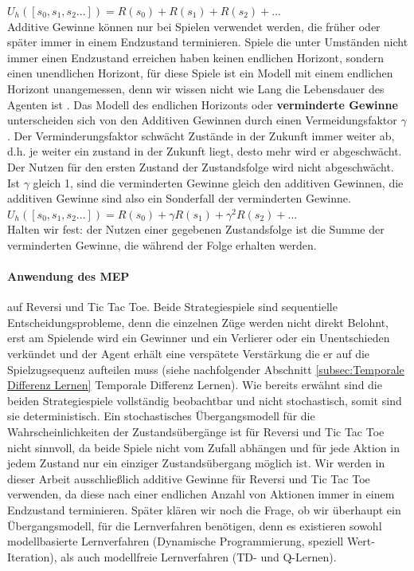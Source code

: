 $U_h([s_0, s_1, s_2 ...]) = R(s_0) + R(s_1) + R(s_2) + ...$ \\

Additive Gewinne können nur bei Spielen verwendet werden, die früher oder später immer in einem Endzustand terminieren. Spiele die unter Umständen nicht immer einen Endzustand erreichen haben keinen endlichen Horizont, sondern einen unendlichen Horizont, für diese Spiele ist ein Modell mit einem endlichen Horizont unangemessen, denn wir wissen nicht wie Lang die Lebensdauer des Agenten ist \cite[250]{KLM96}. Das Modell des endlichen Horizonts oder \textbf{verminderte Gewinne} unterscheiden sich von den Additiven Gewinnen durch einen Vermeidungsfaktor $\gamma$. Der Verminderungsfaktor schwächt Zustände in der Zukunft immer weiter ab, d.h. je weiter ein zustand in der Zukunft liegt, desto mehr wird er abgeschwächt. Der Nutzen für den ersten Zustand der Zustandsfolge wird nicht abgeschwächt. Ist $\gamma$ gleich 1, sind die verminderten Gewinne gleich den additiven Gewinnen, die additiven Gewinne sind also ein Sonderfall der verminderten Gewinne.\\

$U_h([s_0, s_1, s_2 ...]) = R(s_0) + \gamma R(s_1) + \gamma^2 R(s_2) + ...$ \\

Halten wir fest: der Nutzen einer gegebenen Zustandsfolge ist die Summe der verminderten Gewinne, die während der Folge erhalten werden.

\paragraph{Anwendung des MEP} auf Reversi und Tic Tac Toe. Beide Strategiespiele sind sequentielle Entscheidungsprobleme, denn die einzelnen Züge werden nicht direkt Belohnt, erst am Spielende wird ein Gewinner und ein Verlierer oder ein Unentschieden verkündet und der Agent erhält eine verspätete Verstärkung die er auf die Spielzugsequenz aufteilen muss (siehe nachfolgender Abschnitt \ref{subsec:Temporale Differenz Lernen} Temporale Differenz Lernen). Wie bereits erwähnt sind die beiden Strategiespiele vollständig beobachtbar und nicht stochastisch, somit sind sie deterministisch. Ein stochastisches Übergangsmodell für die Wahrscheinlichkeiten der Zustandsübergänge ist für Reversi und Tic Tac Toe nicht sinnvoll, da beide Spiele nicht vom Zufall abhängen und für jede Aktion in jedem Zustand nur ein einziger Zustandsübergang möglich ist. Wir werden in dieser Arbeit ausschließlich additive Gewinne für Reversi und Tic Tac Toe verwenden, da diese nach einer endlichen Anzahl von Aktionen immer in einem Endzustand terminieren. Später klären wir noch die Frage, ob wir überhaupt ein Übergangsmodell, für die Lernverfahren benötigen, denn es existieren sowohl modellbasierte Lernverfahren (Dynamische Programmierung, speziell Wert-Iteration), als auch modellfreie Lernverfahren (TD- und Q-Lernen). 

